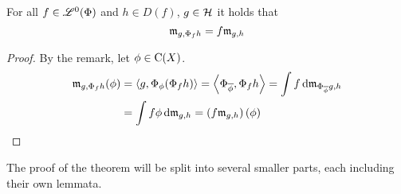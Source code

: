 \begin{lem}
 
  For all $f \in \mathscr{L}^0(\Phi)$ and $h \in D(f)$, $g\in \mathcal{H}$ it holds that
 \[
 \mathfrak{m}_{g, \Phi_f h} = f\mathfrak{m}_{g,h}
 \]

\end{lem}

\begin{proof}
 By the remark, let $\phi \in \operatorname{C}(X)$.
 \begin{align*}
   \mathfrak{m}_{g, \Phi_f h}(\phi) &= \left\langle g, \Phi_\phi (\Phi_f h) \right\rangle 
			  = \left\langle \Phi_{\overline{\phi}} , \Phi_f h \right\rangle
			  = \int f \operatorname{d}\! \mathfrak{m}_{\Phi_{\overline{\phi}} g, h}\\
			  &= \int f \phi \operatorname{d}\! \mathfrak{m}_{g,h}
			  = \left( f \mathfrak{m}_{g,h} \right)(\phi)
 \end{align*}

\end{proof}


The proof of the theorem will be split into several smaller parts, each including their own lemmata.


